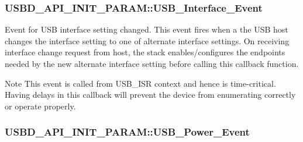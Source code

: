 \hypertarget{structUSBD__API__INIT__PARAM_a8582d6606f3154437b513800a6bff4c9}{
\subsubsection[{U\-S\-B\-\_\-\-Interface\-\_\-\-Event}]{ U\-S\-B\-D\-\_\-\-A\-P\-I\-\_\-\-I\-N\-I\-T\-\_\-\-P\-A\-R\-A\-M\-::\-U\-S\-B\-\_\-\-Interface\-\_\-\-Event}}\label{structUSBD__API__INIT__PARAM_a8582d6606f3154437b513800a6bff4c9}
Event for U\-S\-B interface setting changed. This event fires when a the U\-S\-B host changes the interface setting to one of alternate interface settings. On receiving interface change request from host, the stack enables/configures the endpoints needed by the new alternate interface setting before calling this callback function. \par
 \begin{DoxyNote}{Note}
This event is called from U\-S\-B\-\_\-\-I\-S\-R context and hence is time-\/critical. Having delays in this callback will prevent the device from enumerating correctly or operate properly. 
\end{DoxyNote}
\hypertarget{structUSBD__API__INIT__PARAM_af2aaf61b6e8ada6c2d50b61d516e2db6}{
\subsubsection[{U\-S\-B\-\_\-\-Power\-\_\-\-Event}]{ U\-S\-B\-D\-\_\-\-A\-P\-I\-\_\-\-I\-N\-I\-T\-\_\-\-P\-A\-R\-A\-M\-::\-U\-S\-B\-\_\-\-Power\-\_\-\-Event}}\label{structUSBD__API__INIT__PARAM_af2aaf61b6e8ada6c2d50b61d516e2db6}

